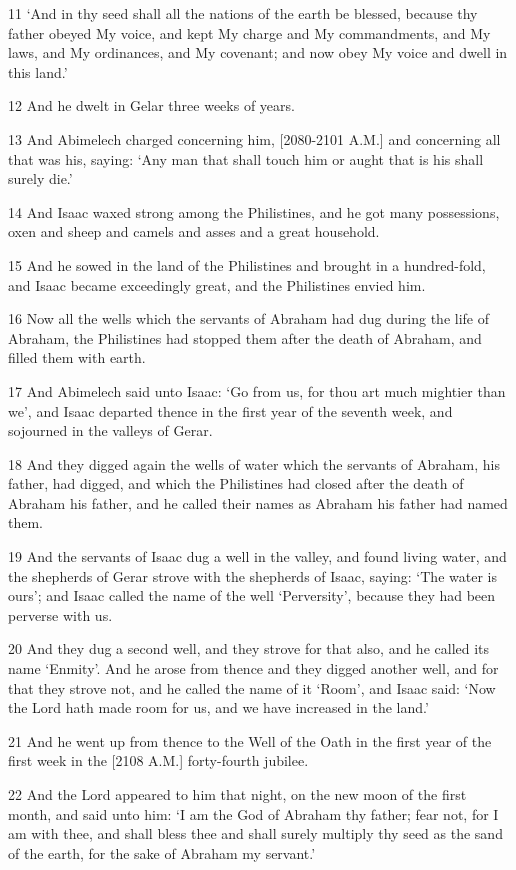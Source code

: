 \par 11 ‘And in thy seed shall all the nations of the earth be blessed, because thy father obeyed My voice, and kept My charge and My commandments, and My laws, and My ordinances, and My covenant; and now obey My voice and dwell in this land.’
\par 12 And he dwelt in Gelar three weeks of years.
\par 13 And Abimelech charged concerning him, [2080-2101 A.M.] and concerning all that was his, saying: ‘Any man that shall touch him or aught that is his shall surely die.’
\par 14 And Isaac waxed strong among the Philistines, and he got many possessions, oxen and sheep and camels and asses and a great household.
\par 15 And he sowed in the land of the Philistines and brought in a hundred-fold, and Isaac became exceedingly great, and the Philistines envied him.
\par 16 Now all the wells which the servants of Abraham had dug during the life of Abraham, the Philistines had stopped them after the death of Abraham, and filled them with earth.
\par 17 And Abimelech said unto Isaac: ‘Go from us, for thou art much mightier than we’, and Isaac departed thence in the first year of the seventh week, and sojourned in the valleys of Gerar.
\par 18 And they digged again the wells of water which the servants of Abraham, his father, had digged, and which the Philistines had closed after the death of Abraham his father, and he called their names as Abraham his father had named them.
\par 19 And the servants of Isaac dug a well in the valley, and found living water, and the shepherds of Gerar strove with the shepherds of Isaac, saying: ‘The water is ours’; and Isaac called the name of the well ‘Perversity’, because they had been perverse with us.
\par 20 And they dug a second well, and they strove for that also, and he called its name ‘Enmity’. And he arose from thence and they digged another well, and for that they strove not, and he called the name of it ‘Room’, and Isaac said: ‘Now the Lord hath made room for us, and we have increased in the land.’
\par 21 And he went up from thence to the Well of the Oath in the first year of the first week in the [2108 A.M.] forty-fourth jubilee.
\par 22 And the Lord appeared to him that night, on the new moon of the first month, and said unto him: ‘I am the God of Abraham thy father; fear not, for I am with thee, and shall bless thee and shall surely multiply thy seed as the sand of the earth, for the sake of Abraham my servant.’
